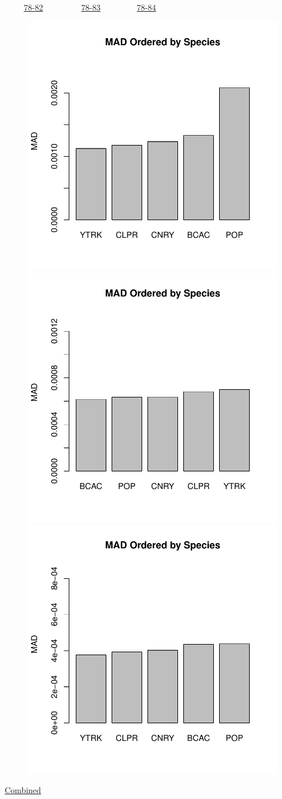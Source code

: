 \documentclass[ xcolor = pdftex, dvipsnames, table ]{beamer}
\begin{document}
\begin{frame}{$~~~~~~~~~$ \href{https://github.com/gasduster99/sppComp/tree/master/sscRuns/26919781982M4}{78-82} $~~~~~~~~~~~~~~~~~~$ \href{https://github.com/gasduster99/sppComp/tree/master/sscRuns/26919781983M4}{78-83} $~~~~~~~~~~~~~~~~~$ \href{https://github.com/gasduster99/sppComp/tree/master/sscRuns/26919781984M4}{78-84} }
        \begin{figure}[ht!]
        \centering
        \hspace*{-1cm}
        \includegraphics[width=.4\textwidth]{../sscRuns/26919781982M4/sppHeadMad68.pdf}
        \includegraphics[width=.4\textwidth]{../sscRuns/26919781983M4/sppHeadMad68.pdf}
        \includegraphics[width=.4\textwidth]{../sscRuns/26919781984M4/sppHeadMad68.pdf}
        \end{figure}
	\vspace{-1cm}
	\begin{center}
	\Large
	\href{https://github.com/gasduster99/sppComp/tree/master/try1/postSSC/26919781982345M4}{Combined}
	\end{center}
\end{frame}
\end{document}
